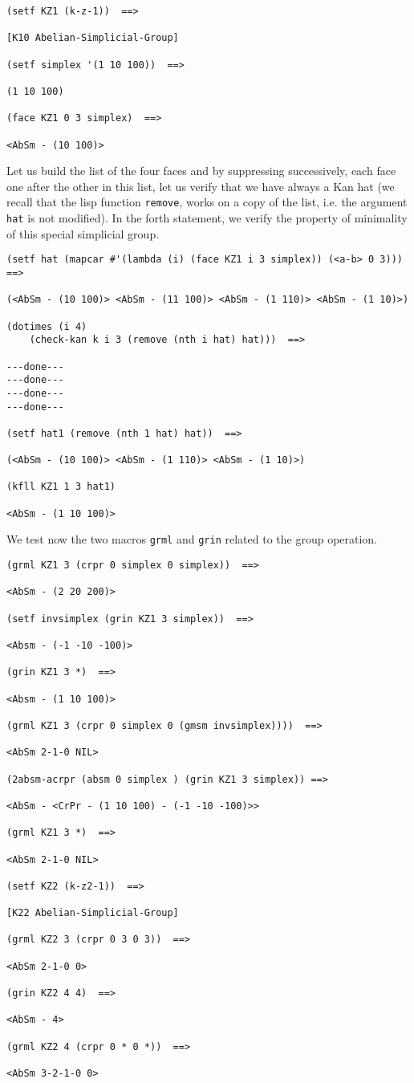 {\footnotesize\begin{verbatim}
(setf KZ1 (k-z-1))  ==>

[K10 Abelian-Simplicial-Group]

(setf simplex '(1 10 100))  ==>

(1 10 100)

(face KZ1 0 3 simplex)  ==>

<AbSm - (10 100)>
\end{verbatim}}
Let us build the list of the four faces and by suppressing successively, each face one after the other
in this list, let us verify that we have always a Kan hat (we recall that the lisp function {\tt remove}, works
on a copy of the list, i.e. the argument {\tt hat} is not modified). In the forth  statement, we
verify the property of minimality of this special simplicial group.
{\footnotesize\begin{verbatim}
(setf hat (mapcar #'(lambda (i) (face KZ1 i 3 simplex)) (<a-b> 0 3)))  ==>

(<AbSm - (10 100)> <AbSm - (11 100)> <AbSm - (1 110)> <AbSm - (1 10)>)

(dotimes (i 4)
    (check-kan k i 3 (remove (nth i hat) hat)))  ==>

---done---
---done---
---done---
---done---

(setf hat1 (remove (nth 1 hat) hat))  ==>

(<AbSm - (10 100)> <AbSm - (1 110)> <AbSm - (1 10)>)

(kfll KZ1 1 3 hat1)

<AbSm - (1 10 100)>
\end{verbatim}}
We test now the two macros {\tt grml} and {\tt grin} related to the group operation. 
{\footnotesize\begin{verbatim}
(grml KZ1 3 (crpr 0 simplex 0 simplex))  ==>

<AbSm - (2 20 200)>

(setf invsimplex (grin KZ1 3 simplex))  ==>

<Absm - (-1 -10 -100)>

(grin KZ1 3 *)  ==>

<Absm - (1 10 100)>

(grml KZ1 3 (crpr 0 simplex 0 (gmsm invsimplex))))  ==>

<AbSm 2-1-0 NIL>

(2absm-acrpr (absm 0 simplex ) (grin KZ1 3 simplex)) ==>

<AbSm - <CrPr - (1 10 100) - (-1 -10 -100)>>

(grml KZ1 3 *)  ==>

<AbSm 2-1-0 NIL>

(setf KZ2 (k-z2-1))  ==>

[K22 Abelian-Simplicial-Group]

(grml KZ2 3 (crpr 0 3 0 3))  ==>

<AbSm 2-1-0 0>

(grin KZ2 4 4)  ==>

<AbSm - 4>

(grml KZ2 4 (crpr 0 * 0 *))  ==>

<AbSm 3-2-1-0 0>
\end{verbatim}}
